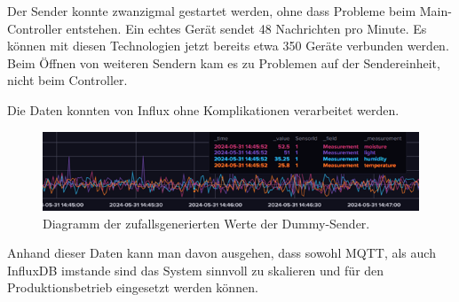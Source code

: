 Der Sender konnte zwanzigmal gestartet werden, ohne dass Probleme beim Main-Controller entstehen. Ein echtes Gerät sendet 48 Nachrichten pro Minute. Es können mit diesen Technologien jetzt bereits etwa 350 Geräte verbunden werden. Beim Öffnen von weiteren Sendern kam es zu Problemen auf der Sendereinheit, nicht beim Controller.

Die Daten konnten von Influx ohne Komplikationen verarbeitet werden.

\begin{figure}[H]
\centering
\includegraphics[width=\textwidth]{images/stresstest.png}
\caption{Diagramm der zufallsgenerierten Werte der Dummy-Sender. \cite{lameres1998fuzzy}}
\label{fig:Fuzzy Voltage Controller}
\end{figure}

Anhand dieser Daten kann man davon ausgehen, dass sowohl MQTT, als auch InfluxDB imstande sind das System sinnvoll zu skalieren und für den Produktionsbetrieb eingesetzt werden können.
